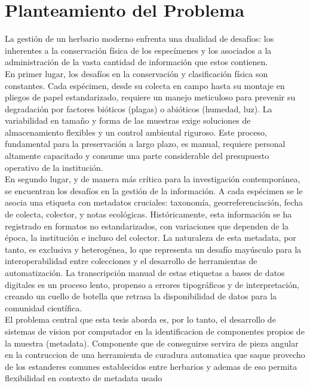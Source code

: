  
 

\section{Planteamiento del Problema}



La gestión de un herbario moderno enfrenta una dualidad de desafíos: los inherentes a la conservación física de los especímenes y los asociados a la administración de la vasta cantidad de información que estos contienen.\\
En primer lugar, los desafíos en la conservación y clasificación física son constantes. Cada espécimen, desde su colecta en campo hasta su montaje en pliegos de papel estandarizado, requiere un manejo meticuloso para prevenir su degradación por factores bióticos (plagas) o abióticos (humedad, luz). La variabilidad en tamaño y forma de las muestras exige soluciones de almacenamiento flexibles y un control ambiental riguroso. Este proceso, fundamental para la preservación a largo plazo, es manual, requiere personal altamente capacitado y consume una parte considerable del presupuesto operativo de la institución.\\
En segundo lugar, y de manera más crítica para la investigación contemporánea, se encuentran los desafíos en la gestión de la información. A cada espécimen se le asocia una etiqueta con metadatos cruciales: taxonomía, georreferenciación, fecha de colecta, colector, y notas ecológicas. Históricamente, esta información se ha registrado en formatos no estandarizados, con variaciones que dependen de la época, la institución e incluso del colector. La naturaleza de esta metadata, por tanto, es exclusiva y heterogénea, lo que representa un desafío mayúsculo para la interoperabilidad entre colecciones y el desarrollo de herramientas de automatización. La transcripción manual de estas etiquetas a bases de datos digitales es un proceso lento, propenso a errores tipográficos y de interpretación, creando un cuello de botella que retrasa la disponibilidad de datos para la comunidad científica.\\
El problema central que esta tesis aborda es, por lo tanto, el desarrollo de sistemas de vision por computador en la identificacion de componentes propios de la muestra (metadata). Componente que de conseguirse servira de pieza angular en la contruccion de una herramienta de curadura automatica que saque provecho de los estanderes comunes establecidos entre herbarios y ademas de eso permita flexibilidad en contexto de metadata usado 

